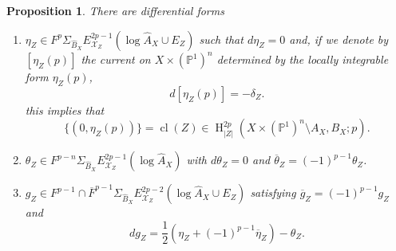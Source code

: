 \documentclass[11pt,a4paper]{amsart}
\renewcommand{\P}{\mathds{P}}
\newcommand{\caX}{\mathcal{X}}
\DeclareMathOperator {\cl}{cl}
\DeclareMathOperator{\rH}{H}
\numberwithin{equation}{section}
\theoremstyle{plain}
\newtheorem{prop}{Proposition}[section]
\theoremstyle{definition}
\begin{document}
\begin{prop}\cite[Proposition 3.6]{BGGP:Height}\label{prop-difformZ}
There are
  differential forms
  \begin{enumerate}
  \item $\eta_{Z}\in F^{p}\Sigma _{\widehat{B}_X}E^{2p-1}_{\caX_{Z}}(\log
  \widehat{A}_X\cup E_{Z})$ such that $d\eta_{Z}=0$ and, if we denote
  by $[\eta_{Z}(p)]$ the current on $X\times (\P^{1})^{n}$ determined
  by the locally integrable form $\eta_{Z}(p)$, 
  \begin{equation}\label{eq:54}
    d[\eta_{Z}(p)]=-\delta _Z.
  \end{equation}
  this implies that 
  \begin{equation}
    \label{eq:19}
    \{(0,\eta_{Z}(p))\}=\cl(Z)\in
    \rH^{2p}_{|Z|}(X\times (\P^1)^n\setminus A_{X},B_{X}; p). 
  \end{equation}  
\item $\theta_{Z} \in F^{p-n}\Sigma _{\widehat{B}_X}
  E^{2p-1}_{\caX_{Z}}(\log
  \widehat{A}_X)$ with $d\theta_{Z} =0$ and
  $\overline \theta_{Z} =(-1)^{p-1}\theta_{Z}$.
\item $g_{Z}\in F^{p-1}\cap \overline F^{p-1} \Sigma
  _{\widehat{B}_X}E^{2p-2}_{\caX_{Z}}(\log \widehat{A}_{X}\cup E_{Z})$
  satisfying $\overline g_{Z}=(-1)^{p-1}g_{Z}$ and 
  \begin{equation}
    \label{eq:21}
    d g_{Z} = \frac{1}{2}(\eta_{Z}+(-1)^{p-1}\overline \eta_{Z})-\theta _{Z}.
  \end{equation}
  \end{enumerate}
\end{prop}
\end{document}
